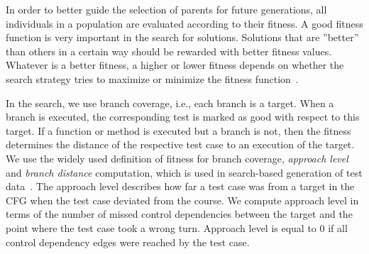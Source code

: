 \documentclass[paper=a4,%
  twoside,%
  BCOR4mm,%
  abstract=true,%
  toc=bibliography,%
  chapterprefix=true,%
  toc=bibliographynumbered,%
  open=right,%
  english,%
  pagesize=pdftex]{scrreprt}
\newcommand{\cfg}{\ac{CFG}\xspace}
\begin{document}
In order to better guide the selection of parents for future generations, all individuals in a population are evaluated according to their fitness. A good fitness function is very important in the search for solutions. Solutions that are ''better'' than others in a certain way should be rewarded with better fitness values. Whatever is a better fitness, a higher or lower fitness depends on whether the search strategy tries to maximize or minimize the fitness function~\cite{McMinn_2004}.



In the search, we use branch coverage, i.e., each branch is a target. When a branch is executed, the corresponding test is marked as good with respect to this target. If a function or method is executed but a branch is not, then the fitness determines the distance of the respective test case to an execution of the target. We use the widely used definition of fitness for branch coverage, \emph{approach level} and \emph{branch distance} computation, which is used in search-based generation of test data~\cite{McMinn_2004}. The approach level describes how far a test case was from a target in the \cfg when the test case deviated from the course. We compute approach level in terms of the number of missed control dependencies between the target and the point where the test case took a wrong turn. Approach level is equal to $0$ if all control dependency edges were reached by the test case.
\end{document}
